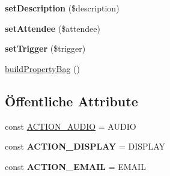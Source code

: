 \begin{DoxyCompactItemize}
{\bfseries set\+Description} (\$description)
\item 
\mbox{\label{class_eluceo_1_1i_cal_1_1_component_1_1_alarm_aa17c67a11c87d0edb33d998b51aa6c4c}} 
{\bfseries set\+Attendee} (\$attendee)
\item 
\mbox{\label{class_eluceo_1_1i_cal_1_1_component_1_1_alarm_a31d3f11d01ebda289718f2723f8d6ee7}} 
{\bfseries set\+Trigger} (\$trigger)
\item 
\mbox{\hyperlink{class_eluceo_1_1i_cal_1_1_component_1_1_alarm_a686e825a428bca61a7161f305b0c1bad}{build\+Property\+Bag}} ()
\end{DoxyCompactItemize}
\subsection*{Öffentliche Attribute}
\begin{DoxyCompactItemize}
\item 
const \mbox{\hyperlink{class_eluceo_1_1i_cal_1_1_component_1_1_alarm_a17eff4fa9c447a7f9d870c94c715f731}{A\+C\+T\+I\+O\+N\+\_\+\+A\+U\+D\+IO}} = \textquotesingle{}A\+U\+D\+IO\textquotesingle{}
\item 
\mbox{\label{class_eluceo_1_1i_cal_1_1_component_1_1_alarm_ab88b729e5486ffe23e6b89c9678231dc}} 
const {\bfseries A\+C\+T\+I\+O\+N\+\_\+\+D\+I\+S\+P\+L\+AY} = \textquotesingle{}D\+I\+S\+P\+L\+AY\textquotesingle{}
\item 
\mbox{\label{class_eluceo_1_1i_cal_1_1_component_1_1_alarm_abfce6b9d385a403034b162e7e6bcc56e}} 
const {\bfseries A\+C\+T\+I\+O\+N\+\_\+\+E\+M\+A\+IL} = \textquotesingle{}E\+M\+A\+IL\textquotesingle{}
\end{DoxyCompactItemize}

